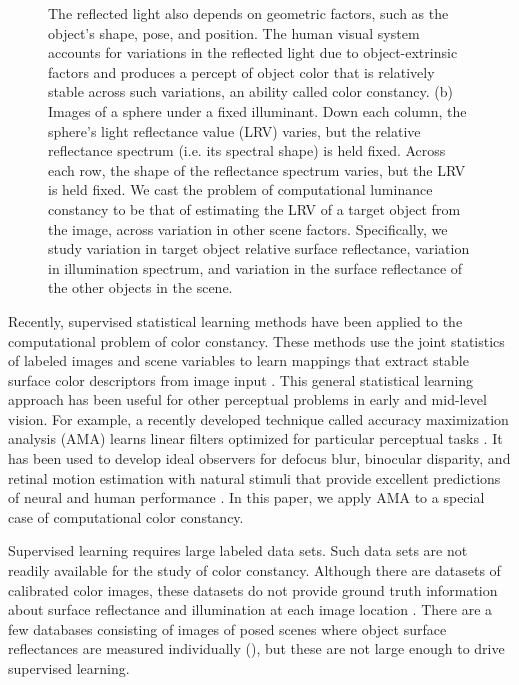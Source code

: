 \documentclass{jov}
\begin{document}
\begin{figure}
{The reflected light also depends on geometric factors, such as the object's shape, pose, and position. 
The human visual system accounts for variations in the reflected light due to object-extrinsic factors and produces a percept of object color that is relatively stable across such variations, an ability called color constancy. 
(b) Images of a sphere under a fixed illuminant.  
Down each column, the sphere's light reflectance value (LRV) varies, but the relative reflectance spectrum (i.e. its spectral shape) is held fixed.
Across each row, the shape of the reflectance spectrum varies, but the LRV is held fixed.
We cast the problem of computational luminance constancy to be that of estimating the LRV of a target object from the image, across variation in other scene factors. 
Specifically, we study variation in target object relative surface reflectance, variation in illumination spectrum, and variation in the surface reflectance of the other objects in the scene.}
 \end{figure}

Recently, supervised statistical learning methods have been applied to the computational problem of color constancy.
These methods use the joint statistics of labeled images and scene variables to learn mappings that extract stable surface color descriptors from image input \cite{barron2015convolutional}.
This general statistical learning approach has been useful for other perceptual problems in early and mid-level vision.
For example, a recently developed technique called accuracy maximization analysis (AMA) learns linear filters optimized for particular perceptual tasks \cite{geisler2009optimal,burge2017accuracy,jaini2017linking}. It has been used to develop ideal observers for defocus blur, binocular disparity, and retinal motion estimation with natural stimuli that provide excellent predictions of neural and human performance \cite{burge2011optimal, burge2012optimal, burge2014optimal, burge2015optimal}.
In this paper, we apply AMA to a special case of computational color constancy. 

Supervised learning requires large labeled data sets.  Such data sets are not readily available for the study of color constancy. Although there are datasets of calibrated color images, these datasets do not provide ground truth information about surface reflectance and illumination at each image location \cite{ChakrabartiHyperspectral,NascimentoFoster2016,ParragaHyperspectralData,TkacikUpennHypersepctralData,skauli2013collection,olmos2004biologically}. There are a few databases consisting of images of posed scenes where object surface reflectances are measured individually (), but these are not large enough to drive supervised learning.
 
\end{document}
